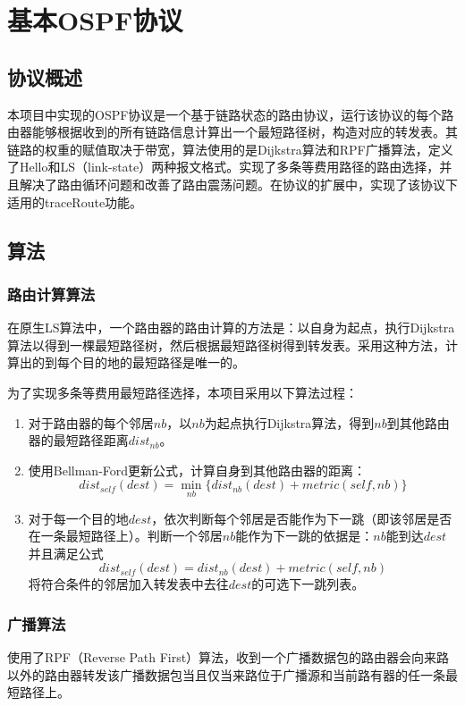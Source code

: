 \section{基本OSPF协议} %
\label{sec:ospf}
	\subsection{协议概述} %
	\label{sub:协议概述}
		本项目中实现的OSPF协议是一个基于链路状态的路由协议，运行该协议的每个路由器能够根据收到的所有链路信息计算出一个最短路径树，构造对应的转发表。其链路的权重的赋值取决于带宽，算法使用的是Dijkstra算法和RPF广播算法，定义了Hello和LS（link-state）两种报文格式。实现了多条等费用路径的路由选择，并且解决了路由循环问题和改善了路由震荡问题。在协议的扩展中，实现了该协议下适用的traceRoute功能。
	\subsection{算法} %
	\label{sub:算法}
		\subsubsection{路由计算算法} %
		\label{ssub:路由计算算法}
			在原生LS算法中，一个路由器的路由计算的方法是：以自身为起点，执行Dijkstra算法以得到一棵最短路径树，然后根据最短路径树得到转发表。采用这种方法，计算出的到每个目的地的最短路径是唯一的。
			\par 为了实现多条等费用最短路径选择，本项目采用以下算法过程：
			\begin{enumerate}
				\item 对于路由器的每个邻居$nb$，以$nb$为起点执行Dijkstra算法，得到$nb$到其他路由器的最短路径距离$dist_{nb}$。
				\item 使用Bellman-Ford更新公式，计算自身到其他路由器的距离：$$dist_{self}(dest) = \min_{nb}\{dist_{nb}(dest) + metric(self,nb)\} $$
				\item 对于每一个目的地$dest$，依次判断每个邻居是否能作为下一跳（即该邻居是否在一条最短路径上）。判断一个邻居$nb$能作为下一跳的依据是：$nb$能到达$dest$并且满足公式$$dist_{self}(dest) = dist_{nb}(dest) + metric(self,nb)$$将符合条件的邻居加入转发表中去往$dest$的可选下一跳列表。
			\end{enumerate}		
		\subsubsection{广播算法} %
		\label{ssub:广播算法}
			使用了RPF（Reverse Path First）算法，收到一个广播数据包的路由器会向来路以外的路由器转发该广播数据包当且仅当来路位于广播源和当前路有器的任一条最短路径上。
